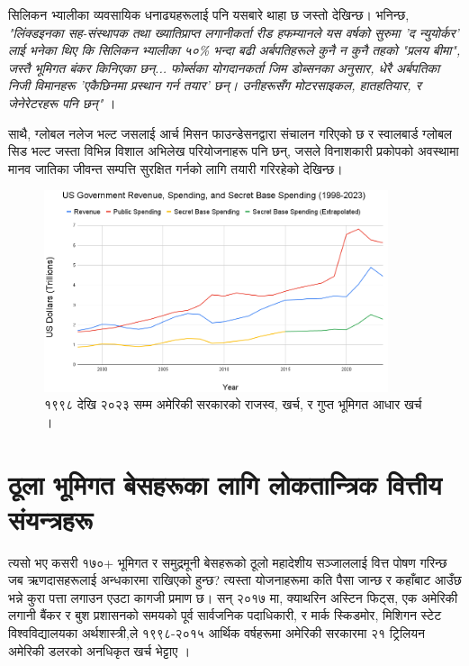 \documentclass[10pt,twocolumn,letterpaper]{article}
\begin{document}
सिलिकन भ्यालीका व्यवसायिक धनाढ्यहरूलाई पनि यसबारे थाहा छ जस्तो देखिन्छ। भनिन्छ, \textit{"लिंक्डइनका सह-संस्थापक तथा ख्यातिप्राप्त लगानीकर्ता रीड हफम्यानले यस वर्षको सुरुमा 'द न्युयोर्कर' लाई भनेका थिए कि सिलिकन भ्यालीका ५०\% भन्दा बढी अर्बपतिहरूले कुनै न कुनै तहको "प्रलय बीमा", जस्तै भूमिगत बंकर किनिएका छन्... फोर्ब्सका योगदानकर्ता जिम डोब्सनका अनुसार, धेरै अर्बपतिका निजी विमानहरू 'एकैछिनमा प्रस्थान गर्न तयार' छन्। उनीहरूसँग मोटरसाइकल, हातहतियार, र जेनेरेटरहरू पनि छन्"} \cite{28}।

साथै, ग्लोबल नलेज भल्ट जसलाई आर्च मिसन फाउन्डेसनद्वारा संचालन गरिएको छ \cite{29} र स्वालबार्ड ग्लोबल सिड भल्ट \cite{30} जस्ता विभिन्न विशाल अभिलेख परियोजनाहरू पनि छन्, जसले विनाशकारी प्रकोपको अवस्थामा मानव जातिका जीवन्त सम्पत्ति सुरक्षित गर्नको लागि तयारी गरिरहेको देखिन्छ।
\begin{figure}[t]
\begin{center}
\includegraphics[width=0.9\textwidth]{govcrop2.png}
\end{center}
   \caption{१९९८ देखि २०२३ सम्म अमेरिकी सरकारको राजस्व, खर्च, र गुप्त भूमिगत आधार खर्च \cite{19}।}
   \label{fig:9}
\end{figure}
\section{ठूला भूमिगत बेसहरूका लागि लोकतान्त्रिक वित्तीय संयन्त्रहरू}

त्यसो भए कसरी १७०+ भूमिगत र समुद्रमूनी बेसहरूको ठूलो महादेशीय सञ्जाललाई वित्त पोषण गरिन्छ जब ऋणदासहरूलाई अन्धकारमा राखिएको हुन्छ? त्यस्ता योजनाहरूमा कति पैसा जान्छ र कहाँबाट आउँछ भन्ने कुरा पत्ता लगाउन एउटा कागजी प्रमाण छ। सन् २०१७ मा, क्याथरिन अस्टिन फिट्स, एक अमेरिकी लगानी बैंकर र बुश प्रशासनको समयको पूर्व सार्वजनिक पदाधिकारी, र मार्क स्किडमोर, मिशिगन स्टेट विश्वविद्यालयका अर्थशास्त्री,ले १९९८-२०१५ आर्थिक वर्षहरूमा अमेरिकी सरकारमा २१ ट्रिलियन अमेरिकी डलरको अनधिकृत खर्च भेट्टाए \cite{11,12,13}।
\end{document}
